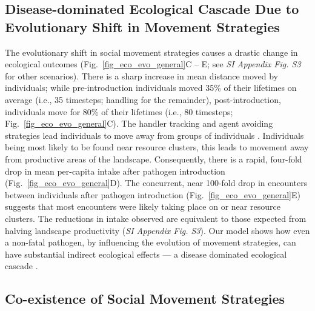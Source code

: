 \subsection*{Disease-dominated Ecological Cascade Due to Evolutionary Shift in Movement Strategies}

The evolutionary shift in social movement strategies causes a drastic change in ecological outcomes (Fig.~\ref{fig_eco_evo_general}C -- E; see \textit{SI Appendix Fig. S3} for other scenarios).
There is a sharp increase in mean distance moved by individuals; while pre-introduction individuals moved 35\% of their lifetimes on average (i.e., 35 timesteps; handling for the remainder), post-introduction, individuals move for 80\% of their lifetimes (i.e., 80 timesteps; Fig.~\ref{fig_eco_evo_general}C).
The handler tracking and agent avoiding strategies lead individuals to move away from groups of individuals \autocite[`dynamic social distancing';][]{pusceddu2021}.
Individuals being most likely to be found near resource clusters, this leads to movement away from productive areas of the landscape.
Consequently, there is a rapid, four-fold drop in mean per-capita intake after pathogen introduction (Fig.~\ref{fig_eco_evo_general}D).
The concurrent, near 100-fold drop in encounters between individuals after pathogen introduction (Fig.~\ref{fig_eco_evo_general}E) suggests that most encounters were likely taking place on or near resource clusters.
The reductions in intake observed are equivalent to those expected from halving landscape productivity (\textit{SI Appendix Fig. S3}).
Our model shows how even a non-fatal pathogen, by influencing the evolution of movement strategies, can have substantial indirect ecological effects --- a disease dominated ecological cascade \autocite{monk2022}.

\subsection*{Co-existence of Social Movement Strategies}

